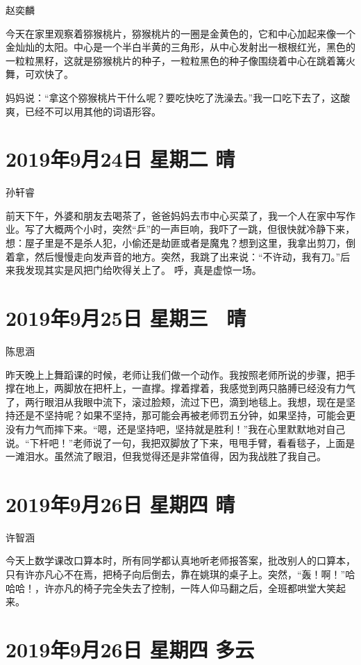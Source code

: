 赵奕麟

今天在家里观察着猕猴桃片，猕猴桃片的一圈是金黄色的，它和中心加起来像一个金灿灿的太阳。中心是一个半白半黄的三角形，从中心发射出一根根红光，黑色的一粒粒黑籽，这就是猕猴桃片的种子，一粒粒黑色的种子像围绕着中心在跳着篝火舞，可欢快了。

妈妈说：“拿这个猕猴桃片干什么呢？要吃快吃了洗澡去。”我一口吃下去了，这酸爽，已经不可以用其他的词语形容。

\section{2019年9月24日 星期二 晴}

孙轩睿

前天下午，外婆和朋友去喝茶了，爸爸妈妈去市中心买菜了，我一个人在家中写作业。写了大概两个小时，突然“乒”的一声巨响，我吓了一跳，但很快就冷静下来，想：屋子里是不是杀人犯，小偷还是劫匪或者是魔鬼？想到这里，我拿出剪刀，倒着拿，然后慢慢走向发声音的地方。突然，我跳了出来说：“不许动，我有刀。”后来我发现其实是风把门给吹得关上了。
呼，真是虚惊一场。

\section{2019年9月25日 星期三~ 晴}

陈思涵

昨天晚上上舞蹈课的时候，老师让我们做一个动作。我按照老师所说的步骤，把手撑在地上，两脚放在把杆上，一直撑。撑着撑着，我感觉到两只胳膊已经没有力气了，两行眼泪从我眼中流下，滚过脸颊，流过下巴，滴到地毯上。我想，现在是坚持还是不坚持呢？如果不坚持，那可能会再被老师罚五分钟，如果坚持，可能会更没有力气而摔下来。“嗯，还是坚持吧，坚持就是胜利！”我在心里默默地对自己说。“下杆吧！”老师说了一句，我把双脚放了下来，甩甩手臂，看看毯子，上面是一滩泪水。虽然流了眼泪，但我觉得还是非常值得，因为我战胜了我自己。

\section{2019年9月26日 星期四 晴}

许智涵

今天上数学课改口算本时，所有同学都认真地听老师报答案，批改别人的口算本，只有许亦凡心不在焉，把椅子向后倒去，靠在姚琪的桌子上。突然，“轰！啊！”哈哈哈！，许亦凡的椅子完全失去了控制，一阵人仰马翻之后，全班都哄堂大笑起来。

\section{2019年9月26日 星期四 多云}

